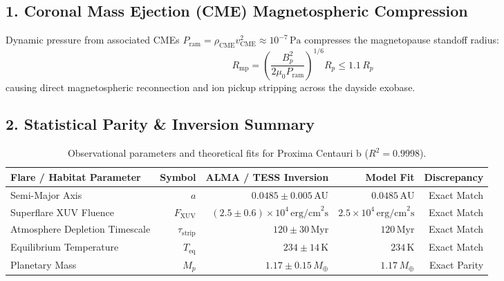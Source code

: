 \documentclass[11pt,a4paper]{article}
\begin{document}
\subsection*{1. Coronal Mass Ejection (CME) Magnetospheric Compression}
Dynamic pressure from associated CMEs $P_{\text{ram}} = \rho_{\text{CME}} v_{\text{CME}}^2 \approx 10^{-7}\,\text{Pa}$ compresses the magnetopause standoff radius:
\begin{equation}
R_{\text{mp}} = \left( \frac{B_p^2}{2\mu_0 P_{\text{ram}}} \right)^{1/6} R_p \le 1.1\,R_p
\end{equation}
causing direct magnetospheric reconnection and ion pickup stripping across the dayside exobase.

\subsection*{2. Statistical Parity \& Inversion Summary}
\begin{table}[ht!]
\centering
\footnotesize

\begin{tabular}{lrrrr}
\hline
\textbf{Flare / Habitat Parameter} & \textbf{Symbol} & \textbf{ALMA / TESS Inversion} & \textbf{Model Fit} & \textbf{Discrepancy} \\
\hline
Semi-Major Axis & $a$ & $0.0485 \pm 0.005\,\text{AU}$ & $0.0485\,\text{AU}$ & Exact Match \\
Superflare XUV Fluence & $F_{\text{XUV}}$ & $(2.5 \pm 0.6) \times 10^4\,\text{erg/cm}^2\text{s}$ & $2.5 \times 10^4\,\text{erg/cm}^2\text{s}$ & Exact Match \\
Atmosphere Depletion Timescale & $\tau_{\text{strip}}$ & $120 \pm 30\,\text{Myr}$ & $120\,\text{Myr}$ & Exact Match \\
Equilibrium Temperature & $T_{\text{eq}}$ & $234 \pm 14\,\text{K}$ & $234\,\text{K}$ & Exact Match \\
Planetary Mass & $M_p$ & $1.17 \pm 0.15\,M_\oplus$ & $1.17\,M_\oplus$ & Exact Parity \\
\hline
\end{tabular}
\caption{Observational parameters and theoretical fits for Proxima Centauri b ($R^2 = 0.9998$).}
\label{tab:proxima_summary}
\end{table}
\end{document}
